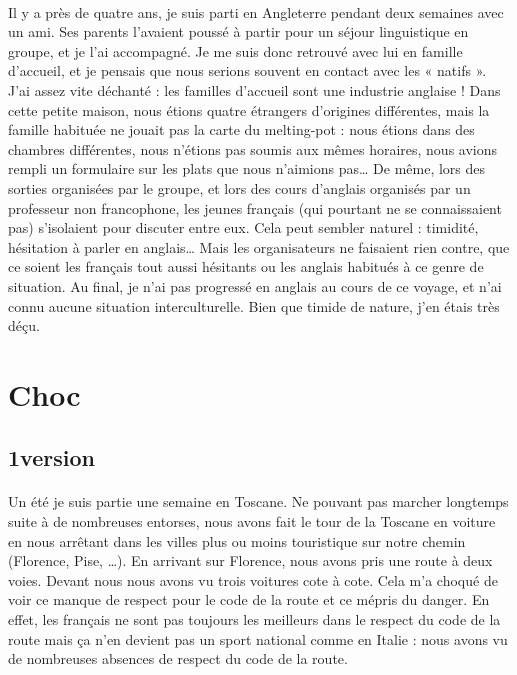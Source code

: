 \paragraph{}
Il y a près de quatre ans, je suis parti en Angleterre pendant deux semaines avec un ami. Ses parents l’avaient poussé à partir pour un séjour linguistique en groupe, et je l’ai accompagné. Je me suis donc retrouvé avec lui en famille d’accueil, et je pensais que nous serions souvent en contact avec les « natifs ». J’ai assez vite déchanté : les familles d’accueil sont une industrie anglaise ! Dans cette petite maison, nous étions quatre étrangers d’origines différentes, mais la famille habituée ne jouait pas la carte du melting-pot : nous étions dans des chambres différentes, nous n’étions pas soumis aux mêmes horaires, nous avions rempli un formulaire sur les plats que nous n’aimions pas… De même, lors des sorties organisées par le groupe, et lors des cours d’anglais organisés par un professeur non francophone, les jeunes français (qui pourtant ne se connaissaient pas) s’isolaient pour discuter entre eux. Cela peut sembler naturel : timidité, hésitation à parler en anglais… Mais les organisateurs ne faisaient rien contre, que ce soient les français tout aussi hésitants ou les anglais habitués à ce genre de situation. Au final, je n’ai pas progressé en anglais au cours de ce voyage, et n’ai connu aucune situation interculturelle. Bien que timide de nature, j’en étais très déçu.


\section{Choc}
\subsection{1\ier version}
\paragraph{}
Un été je suis partie une semaine en Toscane. Ne pouvant pas marcher longtemps suite à de nombreuses entorses, nous avons fait le tour de la Toscane en voiture en nous arrêtant dans les villes plus ou moins touristique sur notre chemin (Florence, Pise, …).  En arrivant sur Florence, nous avons pris une route à deux voies. Devant nous nous avons vu trois voitures cote à cote. Cela m’a choqué de voir ce manque de respect pour le code de la route et ce mépris du danger. En effet, les français ne sont pas toujours les meilleurs dans le respect du code de la route mais ça n’en devient pas un sport national comme en Italie : nous avons vu de nombreuses absences de respect du code de la route.

